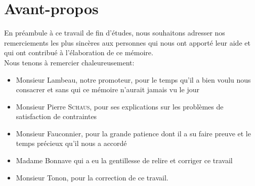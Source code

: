
\newpage
\chapter*{Avant-propos}
En préambule à ce travail de fin d'études, nous souhaitons adresser nos remerciements les plus sincères aux personnes qui nous ont apporté
leur aide et qui ont contribué à l'élaboration de ce mémoire.\\
\newline
\indent
Nous tenons à remercier chaleureusement:\\
\begin{itemize}
\item Monsieur Lambeau, notre promoteur, pour le temps qu'il a bien voulu nous consacrer et sans qui ce mémoire n'aurait jamais vu le jour\\
\item Monsieur Pierre \textsc{Schaus}, pour ses explications sur les problèmes de satisfaction de contraintes\\
\item Monsieur Fauconnier, pour la grande patience dont il a su faire preuve et le temps précieux qu'il nous a accordé\\
\item Madame Bonnave qui a eu la gentillesse de relire et corriger ce travail\\

\item Monsieur Tonon, pour la correction de ce travail.
\end{itemize}
